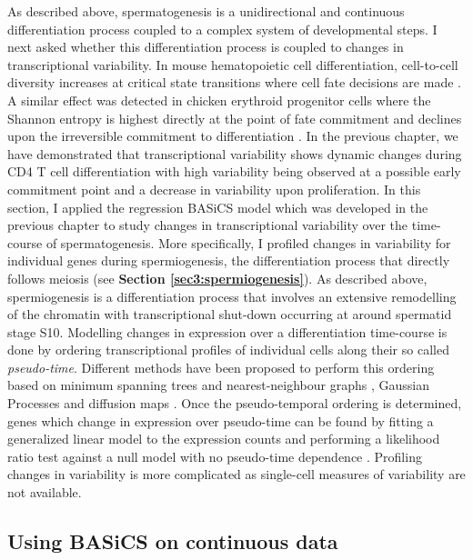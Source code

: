 As described above, spermatogenesis is a unidirectional and continuous differentiation process coupled to a complex system of developmental steps. I next asked whether this differentiation process is coupled to changes in transcriptional variability. In mouse hematopoietic cell differentiation, cell-to-cell diversity increases at critical state transitions where cell fate decisions are made \citep{Mojtahedi2016}. A similar effect was detected in chicken erythroid progenitor cells where the Shannon entropy is highest directly at the point of fate commitment and declines upon the irreversible commitment to differentiation \cite{Richard2016}. In the previous chapter, we have demonstrated that transcriptional variability shows dynamic changes during CD4\plus{} T cell differentiation with high variability being observed at a possible early commitment point and a decrease in variability upon proliferation. In this section, I applied the regression BASiCS model which was developed in the previous chapter to study changes in transcriptional variability over the time-course of spermatogenesis. More specifically, I profiled changes in variability for individual genes during spermiogenesis, the differentiation process that directly follows meiosis (see \textbf{Section \ref{sec3:spermiogenesis}}). As described above, spermiogenesis is a differentiation process that involves an extensive remodelling of the chromatin with transcriptional shut-down occurring at around spermatid stage S10. Modelling changes in expression over a differentiation time-course is done by ordering transcriptional profiles of individual cells along their so called \emph{pseudo-time}. Different methods have been proposed to perform this ordering based on minimum spanning trees \citep{Trapnell2014} and nearest-neighbour graphs \cite{Setty2016}, Gaussian Processes \citep{Reid2016a, Campbell2016b} and diffusion maps \citep{Haghverdi2016}. Once the pseudo-temporal ordering is determined, genes which change in expression over pseudo-time can be found by fitting a generalized linear model to the expression counts and performing a likelihood ratio test against a null model with no pseudo-time dependence \citep{Trapnell2014}. Profiling changes in variability is more complicated as single-cell measures of variability are not available. 

\subsection{Using BASiCS on continuous data}

